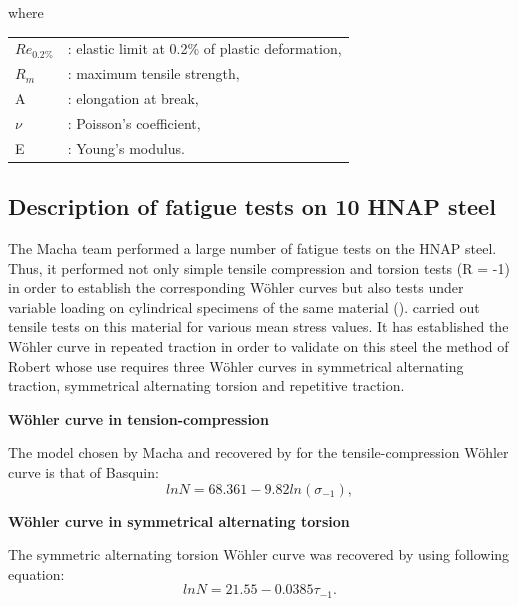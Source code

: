 where 
\begin{table}[!h]
\centering
\begin{tabular}{ll}
$Re_{0.2\%}$ & : elastic limit at 0.2\% of plastic deformation, \\
$R_m$      & : maximum tensile strength,                                                                  \\
A          & : elongation at break,                                                                       \\
$\nu$      & : Poisson's coefficient,                                                                     \\
E          & : Young's modulus.                                                                          
\end{tabular}
\end{table}

\subsection{Description of fatigue tests on 10 HNAP steel}
The Macha team performed a large number of fatigue tests on the HNAP steel. Thus, it performed not only simple tensile compression and torsion tests (R = -1) in order to establish the corresponding Wöhler curves but also tests under variable loading on cylindrical specimens of the same material (\cite{ACHTELIC1994}). \cite{VIDAL1996} carried out tensile tests on this material for various mean stress values. It has established the Wöhler curve in repeated traction in order to validate on this steel the method of Robert whose use requires three Wöhler curves in symmetrical alternating traction, symmetrical alternating torsion and repetitive traction.

\vspace{6pt}
\noindent
\textbf{Wöhler curve in tension-compression}

The model chosen by Macha and recovered by  \cite{jabbado:pastel-00002116} for the tensile-compression Wöhler curve is that of Basquin:
\begin{equation}
lnN=68.361 − 9.82ln\left( \sigma_{-1}\right) ,
\end{equation}

\noindent
\vspace{6pt}
\textbf{Wöhler curve in symmetrical alternating torsion}
\vspace{6pt}

The symmetric alternating torsion Wöhler curve was recovered by \cite{jabbado:pastel-00002116} using following equation:
\begin{equation}
lnN=21.55 − 0.0385\tau_{-1}.
\end{equation}

